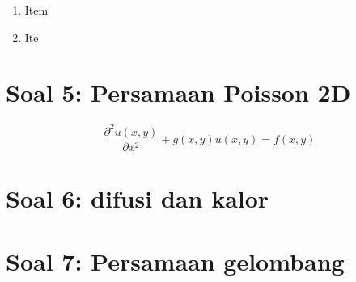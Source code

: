 \documentclass[12pt]{article}
\begin{document}
\begin{enumerate}[label=(\alph*)]
\item Item
\item Ite
\end{enumerate}


\section{Soal 5: Persamaan Poisson 2D}

\begin{equation}
\frac{\partial^2 u(x,y)}{\partial x^2} + g(x,y)u(x,y) = f(x,y)
\end{equation}


\section{Soal 6: difusi dan kalor}




\section{Soal 7: Persamaan gelombang}



%
%
%
%
%
%
%
\end{document}
